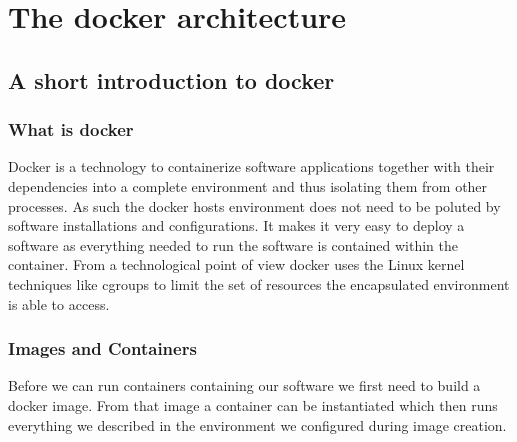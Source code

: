 \chapter{The docker architecture}\label{p01:ch5}
	\section{A short introduction to docker}
		\subsection{What is docker}
		Docker is a technology to containerize software applications together with their dependencies into a complete environment and thus isolating them from other processes. As such the docker hosts environment does not need to be poluted by software installations and configurations. It makes it very easy to deploy a software as everything needed to run the software is contained within the container. From a technological point of view docker uses the Linux kernel techniques like cgroups to limit the set of resources the encapsulated environment is able to access.
		\subsection{Images and Containers}
		Before we can run containers containing our software we first need to build a docker image. From that image a container can be instantiated which then runs everything we described in the environment we configured during image creation.
